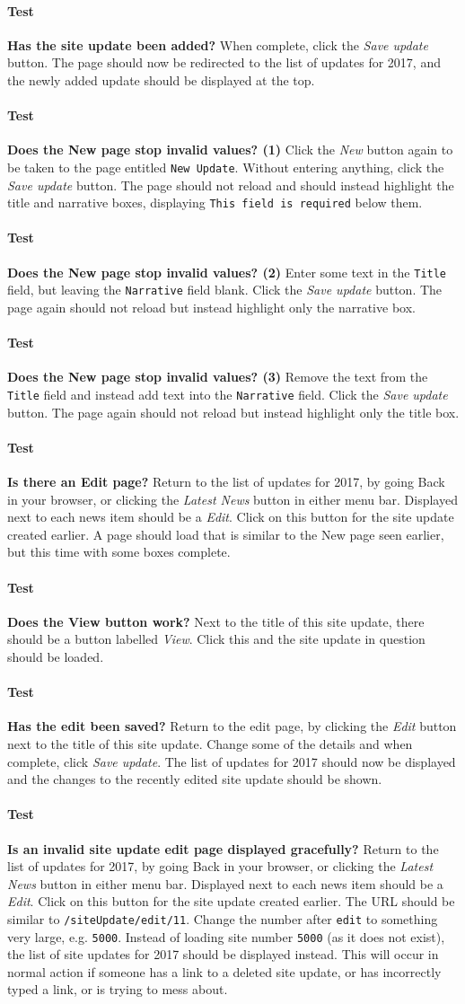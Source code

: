 \documentclass[12pt]{article}
\newcounter{Test}
\newcommand{\test}[1]{%
\stepcounter{Test}%
\paragraph{Test \theTest} \textbf{#1} }
\begin{document}
\test{Has the site update been added?}
When complete, click the \textit{Save update} button. The page should now be redirected to the list of updates for 2017, and the newly added update should be displayed at the top.

\test{Does the New page stop invalid values? (1)}
Click the \textit{New} button again to be taken to the page entitled \texttt{New Update}. Without entering anything, click the \textit{Save update} button. The page should not reload and should instead highlight the title and narrative boxes, displaying \texttt{This field is required} below them.

\test{Does the New page stop invalid values? (2)}
Enter some text in the \texttt{Title} field, but leaving the \texttt{Narrative} field blank. Click the \textit{Save update} button. The page again should not reload but instead highlight only the narrative box.

\test{Does the New page stop invalid values? (3)}
Remove the text from the \texttt{Title} field and instead add text into the \texttt{Narrative} field. Click the \textit{Save update} button. The page again should not reload but instead highlight only the title box.

\test{Is there an Edit page?}
Return to the list of updates for 2017, by going Back in your browser, or clicking the \textit{Latest News} button in either menu bar. Displayed next to each news item should be a \textit{Edit}. Click on this button for the site update created earlier. A page should load that is similar to the New page seen earlier, but this time with some boxes complete.

\test{Does the View button work?}
Next to the title of this site update, there should be a button labelled \textit{View}. Click this and the site update in question should be loaded.

\test{Has the edit been saved?}
Return to the edit page, by clicking the \textit{Edit} button next to the title of this site update. Change some of the details and when complete, click \textit{Save update}. The list of updates for 2017 should now be displayed and the changes to the recently edited site update should be shown.

\test{Is an invalid site update edit page displayed gracefully?}
Return to the list of updates for 2017, by going Back in your browser, or clicking the \textit{Latest News} button in either menu bar. Displayed next to each news item should be a \textit{Edit}. Click on this button for the site update created earlier. The URL should be similar to \texttt{/siteUpdate/edit/11}. Change the number after \texttt{edit} to something very large, e.g. \texttt{5000}. Instead of loading site number \texttt{5000} (as it does not exist), the list of site updates for 2017 should be displayed instead. This will occur in normal action if someone has a link to a deleted site update, or has incorrectly typed a link, or is trying to mess about.
\end{document}
